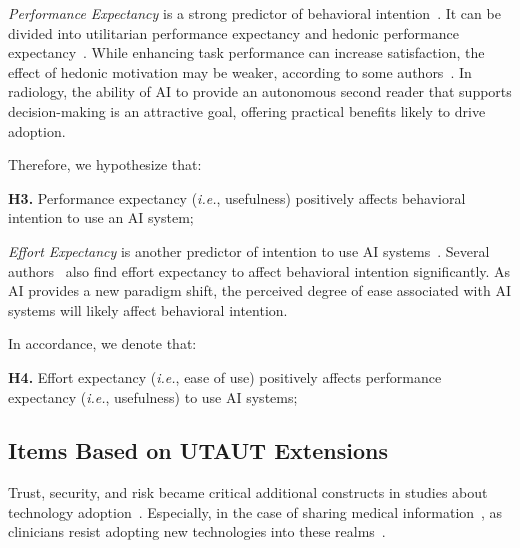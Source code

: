 {\it Performance Expectancy} is a strong predictor of behavioral intention~\cite{KHALILZADEH2017460}.
It can be divided into utilitarian performance expectancy and hedonic performance expectancy~\cite{CALISTO2022102922}.
While enhancing task performance can increase satisfaction, the effect of hedonic motivation may be weaker, according to some authors~\cite{HART201993}.
In radiology, the ability of \ac{AI} to provide an autonomous second reader that supports decision-making is an attractive goal, offering practical benefits likely to drive adoption.

\vspace{2.00mm}

\noindent
Therefore, we hypothesize that:

\vspace{2.00mm}

\noindent
{\bf H3.} Performance expectancy ({\it i.e.}, usefulness) positively affects behavioral intention to use an \ac{AI} system;

\vspace{2.00mm}

{\it Effort Expectancy} is another predictor of intention to use \ac{AI} systems~\cite{CALISTO2022102922}.
Several authors~\cite{KHALILZADEH2017460, HART201993} also find effort expectancy to affect behavioral intention significantly.
As \ac{AI} provides a new paradigm shift, the perceived degree of ease associated with \ac{AI} systems will likely affect behavioral intention.

\vspace{2.00mm}

\noindent
In accordance, we denote that:

\vspace{2.00mm}

\noindent
{\bf H4.} Effort expectancy ({\it i.e.}, ease of use) positively affects performance expectancy ({\it i.e.}, usefulness) to use \ac{AI} systems;

\subsection{Items Based on UTAUT Extensions}
\label{sec:chap004003002}

Trust, security, and risk became critical additional constructs in studies about technology adoption~\cite{KHALILZADEH2017460}.
Especially, in the case of sharing medical information~\cite{CALISTO2022102922}, as clinicians resist adopting new technologies into these realms~\cite{10.1145/3132272.3134111}.


